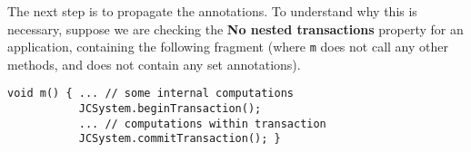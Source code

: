 




The next step is to propagate the annotations. To understand why this
is necessary, suppose we are checking the \textbf{No nested
transactions} property for an application, containing the following
fragment (where \texttt{m} does not call any other methods, and does
not contain any set annotations). 

\begin{verbatim}
void m() { ... // some internal computations
           JCSystem.beginTransaction();
           ... // computations within transaction
           JCSystem.commitTransaction(); }
\end{verbatim}

